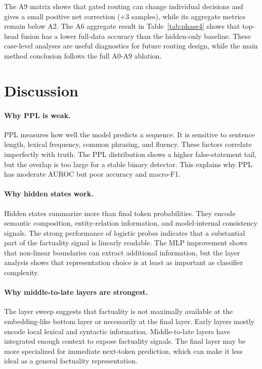 \documentclass[11pt]{article}
\begin{document}
The A9 matrix shows that gated routing can change individual decisions and gives a small positive net correction (+3 samples), while its aggregate metrics remain below A2. The A6 aggregate result in Table~\ref{tab:phase4} shows that top-head fusion has a lower full-data accuracy than the hidden-only baseline. These case-level analyses are useful diagnostics for future routing design, while the main method conclusion follows the full A0-A9 ablation.

\section{Discussion}

\paragraph{Why PPL is weak.}
PPL measures how well the model predicts a sequence. It is sensitive to sentence length, lexical frequency, common phrasing, and fluency. These factors correlate imperfectly with truth. The PPL distribution shows a higher false-statement tail, but the overlap is too large for a stable binary detector. This explains why PPL has moderate AUROC but poor accuracy and macro-F1.

\paragraph{Why hidden states work.}
Hidden states summarize more than final token probabilities. They encode semantic composition, entity-relation information, and model-internal consistency signals. The strong performance of logistic probes indicates that a substantial part of the factuality signal is linearly readable. The MLP improvement shows that non-linear boundaries can extract additional information, but the layer analysis shows that representation choice is at least as important as classifier complexity.

\paragraph{Why middle-to-late layers are strongest.}
The layer sweep suggests that factuality is not maximally available at the embedding-like bottom layer or necessarily at the final layer. Early layers mostly encode local lexical and syntactic information. Middle-to-late layers have integrated enough context to expose factuality signals. The final layer may be more specialized for immediate next-token prediction, which can make it less ideal as a general factuality representation.
\end{document}
